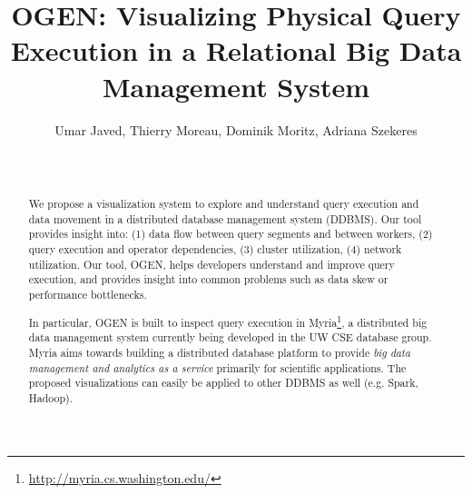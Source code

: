 \documentclass{chi2009}
\newcommand*{\system}{OGEN\xspace}
\newcommand*{\papertitle}{\system: Visualizing Physical Query Execution in a Relational Big Data Management System}
\begin{document}
\setlength{\paperheight}{11in}
\setlength{\paperwidth}{8.5in}
\setlength{\pdfpageheight}{\paperheight}
\setlength{\pdfpagewidth}{\paperwidth}

\toappear{}

\title{\papertitle}
\author{\alignauthor Umar Javed, Thierry Moreau, Dominik Moritz, Adriana Szekeres \\
 \\  \\
}

\maketitle

\begin{abstract}

We propose a visualization system to explore and understand query
execution and data movement in a distributed database management system
(DDBMS). Our tool provides insight into: (1) data flow between query segments
and between workers, (2) query execution and operator dependencies, (3) cluster
utilization, (4) network utilization. Our tool, \system, helps
developers understand and improve query execution, and provides insight into
common problems such as data skew or performance bottlenecks.

In particular, \system is built to inspect query execution in
Myria\footnote{\url{http://myria.cs.washington.edu/}}, a distributed big data
management system currently being developed in the UW CSE database group. Myria
aims towards building a distributed database platform to provide \emph{big data
management and analytics as a service} primarily for scientific applications.
The proposed visualizations can easily be applied to other DDBMS as well (e.g.
Spark, Hadoop).

\end{abstract}


\end{document}
